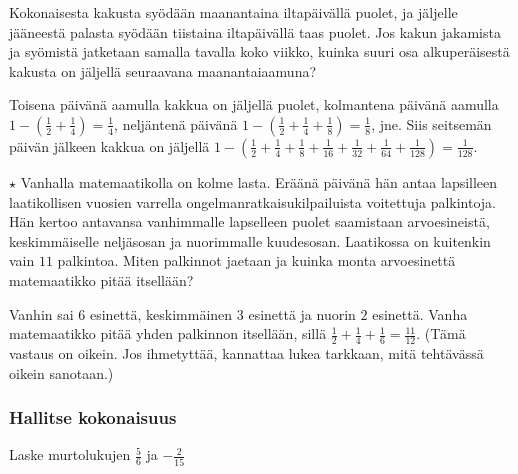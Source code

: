 \begin{tehtavasivu}
\begin{tehtava}
	Kokonaisesta kakusta syödään maanantaina iltapäivällä puolet, ja jäljelle jääneestä palasta syödään tiistaina iltapäivällä taas puolet. Jos kakun jakamista ja syömistä jatketaan samalla tavalla koko viikko, kuinka suuri osa alkuperäisestä kakusta on jäljellä seuraavana maanantaiaamuna?
	\begin{vastaus}
		Toisena päivänä aamulla kakkua on jäljellä puolet, kolmantena päivänä aamulla
		$1-\left(\frac{1}{2} + \frac{1}{4}\right) = \frac{1}{4}$, 
		neljäntenä päivänä
		$1-\left(\frac{1}{2} + \frac{1}{4} + \frac{1}{8}\right)
		= \frac{1}{8}$, jne.
		Siis seitsemän päivän jälkeen kakkua on jäljellä
		$1-\left(\frac{1}{2} + \frac{1}{4} + \frac{1}{8} +
		\frac{1}{16} + \frac{1}{32} + \frac{1}{64} + \frac{1}{128}\right)
		= \frac{1}{128}$.  
	\end{vastaus}
\end{tehtava}

\begin{tehtava}
	$\star$ Vanhalla matemaatikolla on kolme lasta. Eräänä päivänä hän antaa lapsilleen laatikollisen vuosien varrella ongelmanratkaisukilpailuista voitettuja palkintoja. Hän kertoo antavansa vanhimmalle lapselleen puolet saamistaan arvoesineistä, keskimmäiselle neljäsosan ja nuorimmalle kuudesosan. Laatikossa on kuitenkin vain $11$ palkintoa. Miten  palkinnot jaetaan ja kuinka monta arvoesinettä matemaatikko pitää itsellään?
	\begin{vastaus}
		Vanhin sai $6$ esinettä, keskimmäinen $3$ esinettä ja nuorin $2$ esinettä. Vanha matemaatikko pitää yhden palkinnon itsellään, sillä $\frac{1}{2} + \frac{1}{4} + \frac{1}{6} = \frac{11}{12}$. (Tämä vastaus on oikein. Jos ihmetyttää, kannattaa lukea tarkkaan, mitä tehtävässä oikein sanotaan.)
	\end{vastaus}
\end{tehtava}

\subsubsection*{Hallitse kokonaisuus}

\begin{tehtava}
Laske murtolukujen $\frac{5}{6}$ ja $-\frac{2}{15}$
	\begin{vastaus}
	\end{vastaus}
\end{tehtava}


\end{tehtavasivu}
